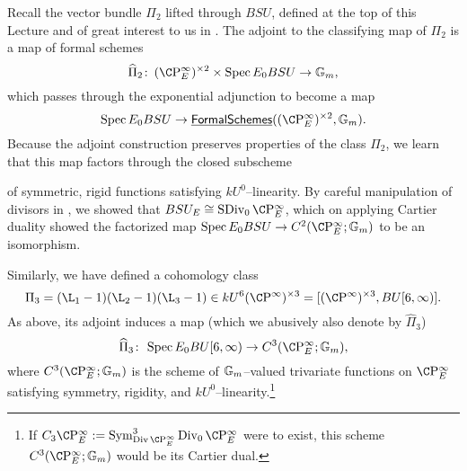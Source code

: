 \begin{example}\label{AdjointBSUExample}
Recall the vector bundle $\Pi_2$ lifted through $BSU$, defined at the top of this Lecture and of great interest to us in .  The adjoint to the classifying map of $\Pi_2$ is a map of formal schemes \[\widehat \Pi_2\co (\CP^\infty_E)^{\times 2} \times \Spec E_0 BSU \to \Gm,\] which passes through the exponential adjunction to become a map \[\Spec E_0 BSU \to \InternalHom{FormalSchemes}((\CP^\infty_E)^{\times 2}, \Gm).\]  Because the adjoint construction preserves properties of the class $\Pi_2$, we learn that this map factors through the closed subscheme
\begin{center}
\end{center}
of symmetric, rigid functions satisfying $kU^0$--linearity.  By careful manipulation of divisors in , we showed that $BSU_E \cong \SDiv_0 \CP^\infty_E$, which on applying Cartier duality showed the factorized map $\Spec E_0 BSU \to C^2(\CP^\infty_E; \Gm)$ to be an isomorphism.
\end{example}

\begin{example}
Similarly, we have defined a cohomology class \[\Pi_3 = (\L_1 - 1)(\L_2 - 1)(\L_3 - 1) \in kU^6(\CP^\infty)^{\times 3} = [(\CP^\infty)^{\times 3}, BU[6, \infty)].\]  As above, its adjoint induces a map (which we abusively also denote by $\widehat \Pi_3$) \[\widehat \Pi_3\co \Spec E_0 BU[6, \infty) \to C^3(\CP^\infty_E; \Gm),\] where $C^3(\CP^\infty_E; \Gm)$ is the scheme of $\mathbb G_m$--valued trivariate functions on $\CP^\infty_E$ satisfying symmetry, rigidity, and $kU^0$--linearity.\footnote{If $C_3 \CP^\infty_E := \Sym^3_{\Div \CP^\infty_E} \Div_0 \CP^\infty_E$ were to exist, this scheme $C^3(\CP^\infty_E; \Gm)$ would be its Cartier dual.}
\end{example}

